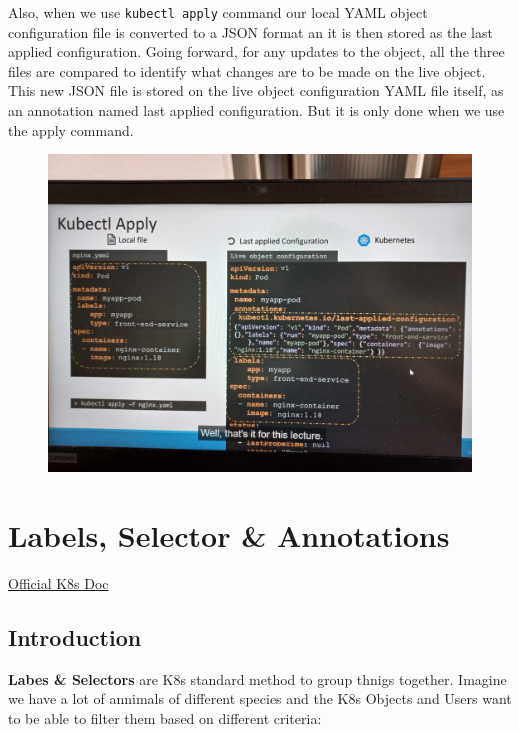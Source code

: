 \documentclass{article}
\begin{document}
Also, when we use \verb|kubectl apply| command our local YAML object configuration file is converted to a JSON format an it is then stored as the last applied configuration. Going forward, for any updates to the object, all the three files are compared to identify what changes are to be made on the live object. This new JSON file is stored on the live object configuration YAML file itself, as an annotation named last applied configuration. But it is only done when we use the apply command.

\begin{figure}[H]
    \centering
    \includegraphics[width=\textwidth]{pictures/apply1.jpeg}
\end{figure}

\newpage
\section{Labels, Selector \& Annotations}

\href{https://kubernetes.io/docs/concepts/overview/working-with-objects/labels/}{Official K8s Doc}

\subsection{Introduction}

\textbf{Labes \& Selectors} are K8s standard method to group thnigs together. Imagine we have a lot of annimals of different species and the K8s Objects and Users want to be able  to filter them based on different criteria: 
\end{document}
